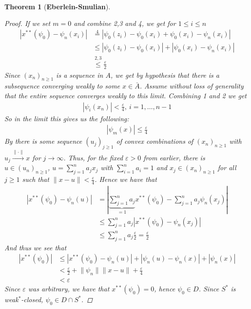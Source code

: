 \documentclass[10pt,twoside,openany,final]{memoir}
\theoremstyle{break}
\newtheorem{theorem}[section]{Theorem}
\theoremstyle{Break}
\newcommand{\lv}{\lVert}
\newcommand{\rv}{\rVert}
\begin{document}
\begin{theorem}[\bfseries{Eberlein-Smulian}]
\begin{proof}
If we set $m=0$ and combine 2,3 and 4, we get for $1\leq i \leq n$
\begin{align*}\label{eq:1} 
|x^{**}(\psi_{0})-\psi_{n}(x_{i})|&\stackrel{4}{=}|\psi_{0}(z_{i})-\psi_{0}(x_{i}) +\psi_{0}(x_{i}) -\psi_{n}(x_{i})|\tag{$\dagger$}\\
&\leq |\psi_{0}(z_{i})-\psi_{0}(x_{i})|+|\psi_{0}(x_{i}) -\psi_{n}(x_{i})|\\
&\stackrel{2,3}{\leq} \frac{\varepsilon}{2}
\end{align*}
Since $(x_{n})_{n \geq 1}$ is a sequence in $A$, we get by hypothesis that there is a subsequence converging weakly to some $x \in \bar{A}$. Assume without loss of generality that the entire sequence converges weakly to this limit. Combining 1 and 2 we get
\begin{align*}
|\psi_{i}(x_{n})| < \frac{\varepsilon}{4}, \ i=1,\dots,n-1
\end{align*}
So in the limit this gives us the following:
\begin{align*}
    |\psi_{m}(x)| \leq \frac{\varepsilon}{4}
\end{align*}
By  there is some sequence $(u_{j})_{j \geq 1}$ of convex combinations of $(x_{n})_{n\geq 1}$ with $u_{j} \stackrel{\lv \cdot \rv}{\to} x$ for $j \to \infty$. Thus, for the fixed $\varepsilon>0$ from earlier, there is $u \in (u_n)_{n \geq 1} $, $u=\sum_{j=1}^n a_{j}x_{j}$ with $\sum_{i=1}^n a_{i}=1$ and $ x_{j} \in (x_{n})_{n\geq 1}$ for all $j \geq 1$ such that $\lv x-u \rv < \frac{\varepsilon}{4}$. Hence we have that
\begin{align*}
|x^{**}(\psi_0)-\psi_{n}(u)|&=|\underbrace{\sum_{j=1}^n a_{j}}_{=1}x^{**}(\psi_{0})-\sum_{j=1}^n a_{j} \psi_{n}(x_{j})|\\
&\leq \sum_{j=1}^n a_{j} | x^{**}(\psi_{0}) - \psi_{n}(x_{j})|\tag{by $\dagger$}\\
&\leq \sum_{j=1}^n a_{j} \frac{\varepsilon}{2}=\frac{\varepsilon}{2}
\end{align*}
And thus we see that
\begin{align*}
|x^{**}(\psi_{0})|&\leq |x^{**}(\psi_{0})-\psi_{n}(u)|+|\psi_{n}(u)-\psi_{n}(x)| + |\psi_{n}(x)|\\
&< \frac{\varepsilon}{2} + \lv \psi_{n} \rv \lv x-u \rv + \frac{\varepsilon}{4} \\
&< \varepsilon
\end{align*}
Since $\varepsilon$ was arbitrary, we have that $x^{**}(\psi_0)=0$, hence $\psi_0 \in D$. Since $S^*$ is weak$^*$-closed, $\psi_0 \in D \cap S^*$.
\end{proof}
\end{theorem}
\end{document}
